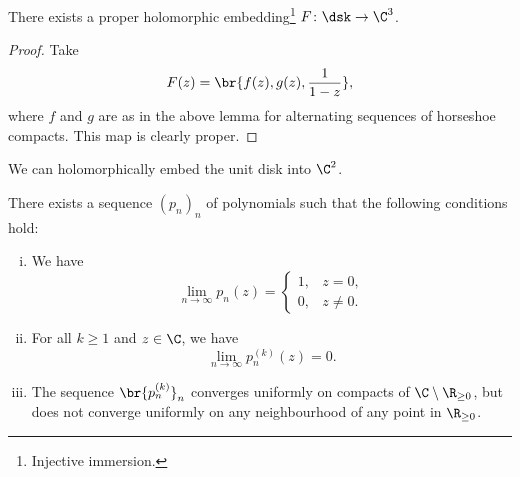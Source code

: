 \begin{izrek}
There exists a proper holomorphic embedding\footnote{Injective
immersion.} $F \colon \dsk \to \C^3$.
\end{izrek}

\begin{proof}
Take
\[
F(z) = \br{f(z), g(z), \frac{1}{1-z}},
\]
where $f$ and $g$ are as in the above lemma for alternating
sequences of horseshoe compacts. This map is clearly proper.
\end{proof}

\begin{opomba}
We can holomorphically embed the unit disk into $\C^2$.
\end{opomba}

\begin{izrek}
There exists a sequence $(p_n)_n$ of polynomials such that the
following conditions hold:

\begin{enumerate}[i)]
\item We have
\[
\lim_{n \to \infty} p_n(z) =
\begin{cases}
1, & z  =  0, \\
0, & z \ne 0.
\end{cases}
\]
\item For all $k \geq 1$ and $z \in \C$, we have
\[
\lim_{n \to \infty} p_n^{(k)}(z) = 0.
\]
\item The sequence $\br{p_n^{(k)}}_n$ converges uniformly on
compacts of $\C \setminus \R_{\geq 0}$, but does not converge
uniformly on any neighbourhood of any point in $\R_{\geq 0}$.
\end{enumerate}
\end{izrek}

